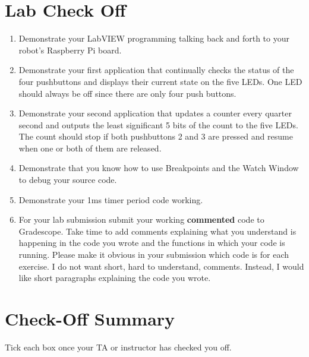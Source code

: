 \documentclass[11pt]{article}
\begin{document}
\section*{Lab Check Off}
%
\begin{enumerate}
    \item Demonstrate your LabVIEW programming talking back and forth to your robot’s Raspberry Pi board.
    \item Demonstrate your first application that continually checks the status of the four pushbuttons and displays their current state on the five LEDs. One LED should always be off since there are only four push buttons.
    \item Demonstrate your second application that updates a counter every quarter second and outputs the least significant 5 bits of the count to the five LEDs. The count should stop if both pushbuttons 2 and 3 are pressed and resume when one or both of them are released.
    \item Demonstrate that you know how to use Breakpoints and the Watch Window to debug your source code.
    \item Demonstrate your 1ms timer period code working.
    \item For your lab submission submit your working \textbf{commented} code to Gradescope. Take time to add comments explaining what you understand is happening in the code you wrote and the functions in which your code is running. Please make it obvious in your submission which code is for each exercise. I do not want short, hard to understand, comments. Instead, I would like short paragraphs explaining the code you wrote.
\end{enumerate}
%
\section*{Check-Off Summary}

Tick each box once your TA or instructor has checked you off.
%
\CheckOffSummary

\MakeFooter
\end{document}

